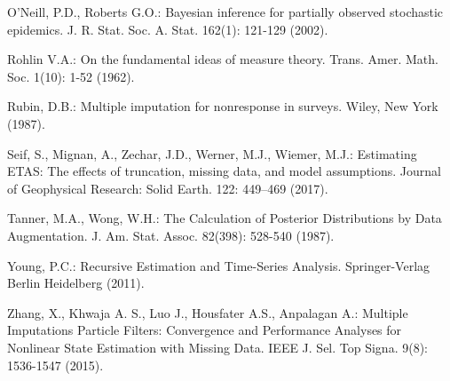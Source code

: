 \begin{thebibliography}{}
O'Neill, P.D., Roberts G.O.: Bayesian inference for partially observed stochastic epidemics. J. R. Stat. Soc. A. Stat. 162(1): 121-129 (2002).

Rohlin V.A.: On the fundamental ideas of measure theory.  Trans.
Amer. Math. Soc. 1(10): 1-52 (1962).

Rubin, D.B.: Multiple imputation for nonresponse in surveys. Wiley, New York (1987).

Seif, S., Mignan, A., Zechar, J.D., Werner, M.J., Wiemer, M.J.: Estimating ETAS: The effects of truncation, missing data, and model assumptions. Journal of Geophysical Research: Solid Earth. 122: 449–469 (2017).

Tanner, M.A., Wong, W.H.: The Calculation of Posterior Distributions by Data Augmentation. J. Am. Stat. Assoc. 82(398): 528-540 (1987).

Young, P.C.: Recursive Estimation and Time-Series Analysis. Springer-Verlag Berlin Heidelberg (2011).

Zhang, X., Khwaja A. S., Luo J., Housfater A.S., Anpalagan A.: Multiple Imputations Particle Filters: Convergence and Performance Analyses for Nonlinear State Estimation with Missing Data. IEEE J. Sel. Top Signa. 9(8): 1536-1547 (2015).

\end{thebibliography}


\clearpage
\appendix






